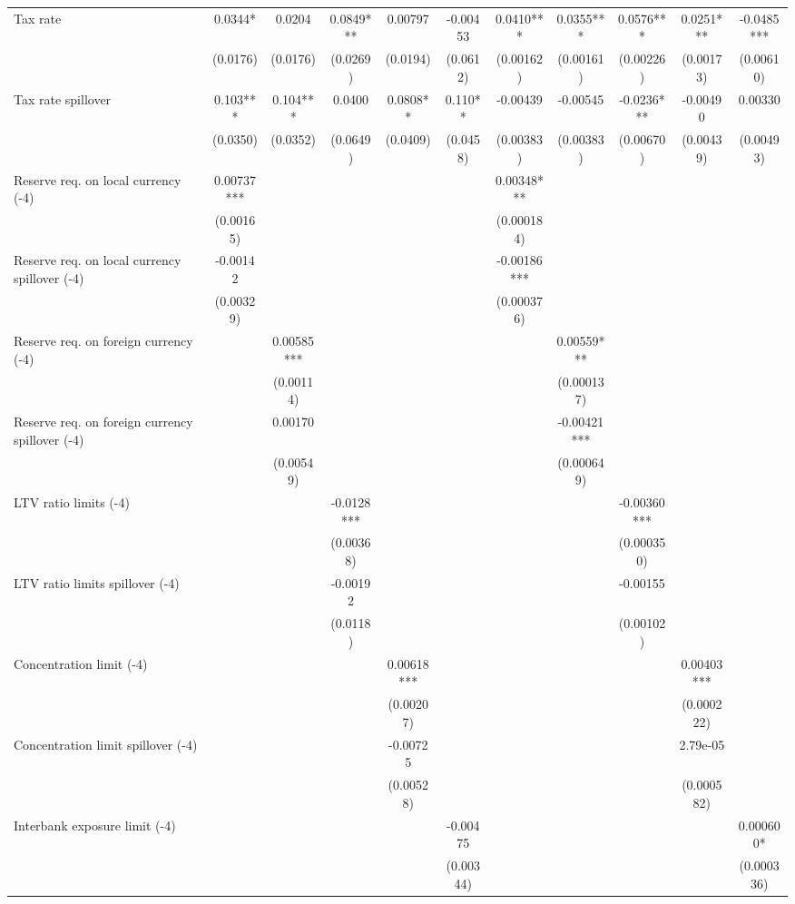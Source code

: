 \begin{tabular}{lcccccccccc}
Tax rate & 0.0344* & 0.0204 & 0.0849*** & 0.00797 & -0.00453 & 0.0410*** & 0.0355*** & 0.0576*** & 0.0251*** & -0.0485*** \\
 & (0.0176) & (0.0176) & (0.0269) & (0.0194) & (0.0612) & (0.00162) & (0.00161) & (0.00226) & (0.00173) & (0.00610) \\
Tax rate spillover & 0.103*** & 0.104*** & 0.0400 & 0.0808** & 0.110** & -0.00439 & -0.00545 & -0.0236*** & -0.00490 & 0.00330 \\
 & (0.0350) & (0.0352) & (0.0649) & (0.0409) & (0.0458) & (0.00383) & (0.00383) & (0.00670) & (0.00439) & (0.00493) \\
Reserve req. on local currency (-4) & 0.00737*** &  &  &  &  & 0.00348*** &  &  &  &  \\
 & (0.00165) &  &  &  &  & (0.000184) &  &  &  &  \\
Reserve req. on local currency spillover (-4) & -0.00142 &  &  &  &  & -0.00186*** &  &  &  &  \\
 & (0.00329) &  &  &  &  & (0.000376) &  &  &  &  \\
Reserve req. on foreign currency (-4) &  & 0.00585*** &  &  &  &  & 0.00559*** &  &  &  \\
 &  & (0.00114) &  &  &  &  & (0.000137) &  &  &  \\
Reserve req. on foreign currency spillover (-4) &  & 0.00170 &  &  &  &  & -0.00421*** &  &  &  \\
 &  & (0.00549) &  &  &  &  & (0.000649) &  &  &  \\
LTV ratio limits (-4) &  &  & -0.0128*** &  &  &  &  & -0.00360*** &  &  \\
 &  &  & (0.00368) &  &  &  &  & (0.000350) &  &  \\
LTV ratio limits spillover (-4) &  &  & -0.00192 &  &  &  &  & -0.00155 &  &  \\
 &  &  & (0.0118) &  &  &  &  & (0.00102) &  &  \\
Concentration limit (-4) &  &  &  & 0.00618*** &  &  &  &  & 0.00403*** &  \\
 &  &  &  & (0.00207) &  &  &  &  & (0.000222) &  \\
Concentration limit spillover (-4) &  &  &  & -0.00725 &  &  &  &  & 2.79e-05 &  \\
 &  &  &  & (0.00528) &  &  &  &  & (0.000582) &  \\
Interbank exposure limit (-4) &  &  &  &  & -0.00475 &  &  &  &  & 0.000600* \\
 &  &  &  &  & (0.00344) &  &  &  &  & (0.000336) \\

\end{tabular}
